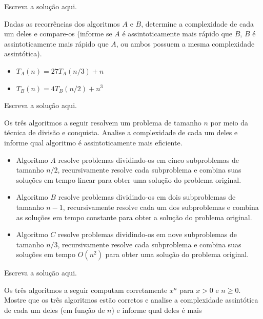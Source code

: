 \documentclass[a4paper]{exam}
\begin{document}
\begin{questions}
  \begin{solution}
    Escreva a solução aqui.
  \end{solution}
  \question Dadas as recorrências dos algoritmos $A$ e
  $B$, determine a complexidade de cada um deles e compare-os
  (informe se $A$ é assintoticamente mais rápido que $B$, $B$
  é assintoticamente mais rápido que $A$, ou ambos possuem a
  mesma complexidade assintótica).
  \begin{itemize}
  \item $T_A(n) = 27T_A(n/3) + n$
  \item $T_B(n) = 4T_B(n/2) + n^3$
  \end{itemize}
  \begin{solution}
    Escreva a solução aqui.
  \end{solution}
  \question Os três algoritmos a seguir resolvem um
  problema de tamanho $n$ por meio da técnica de divisão e conquista.
  Analise a complexidade de cada um deles e informe qual algoritmo é
  assintoticamente mais eficiente.
  \begin{itemize}
  \item Algoritmo $A$ resolve problemas dividindo-os em cinco
    subproblemas de tamanho $n/2$, recursivamente resolve cada
    subproblema e combina suas soluções em tempo linear para obter
    uma solução do problema original.
    \item Algoritmo $B$ resolve problemas dividindo-os em dois
      subproblemas de tamanho $n-1$, recursivamente resolve cada um
      dos subproblemas e combina as soluções em tempo constante para
      obter a solução do problema original.
    \item Algoritmo $C$ resolve problemas dividindo-os em nove 
      subproblemas de tamanho $n/3$, recursivamente resolve cada
      subproblema e combina suas soluções em tempo $O(n^2)$ para obter
      uma solução do problema original.
  \end{itemize}
  \begin{solution}
    Escreva a solução aqui.
  \end{solution}
  \question Os três algoritmos a seguir computam corretamente
  $x^n$ para $x>0$ e $n \geq 0$. Mostre que os três algoritmos estão
  corretos e analise a complexidade assintótica
  de cada um deles (em função de $n$) e informe qual deles é mais

\end{questions}
\end{document}
